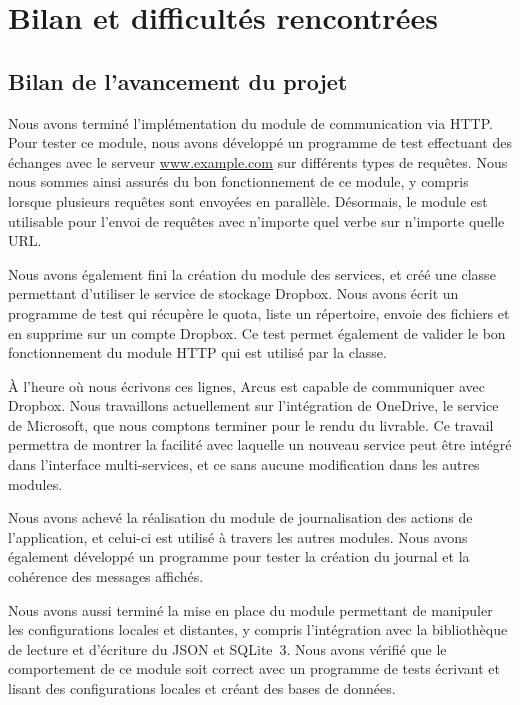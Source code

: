 \chapter{Bilan et difficultés rencontrées}

\section{Bilan de l'avancement du projet}

Nous avons terminé l'implémentation du module de communication via HTTP. Pour tester ce module, nous avons développé un programme de test effectuant des échanges avec le serveur \url{www.example.com} sur différents types de requêtes. Nous nous sommes ainsi assurés du bon fonctionnement de ce module, y compris lorsque plusieurs requêtes sont envoyées en parallèle. Désormais, le module est utilisable pour l'envoi de requêtes avec n'importe quel verbe sur n'importe quelle URL.

Nous avons également fini la création du module des services, et créé une classe permettant d'utiliser le service de stockage Dropbox. Nous avons écrit un programme de test qui récupère le quota, liste un répertoire, envoie des fichiers et en supprime sur un compte Dropbox. Ce test permet également de valider le bon fonctionnement du module HTTP qui est utilisé par la classe.

À l'heure où nous écrivons ces lignes, Arcus est capable de communiquer avec Dropbox. Nous travaillons actuellement sur l'intégration de OneDrive, le service de Microsoft, que nous comptons terminer pour le rendu du livrable. Ce travail permettra de montrer la facilité avec laquelle un nouveau service peut être intégré dans l'interface multi-services, et ce sans aucune modification dans les autres modules.

Nous avons achevé la réalisation du module de journalisation des actions de l'application, et celui-ci est utilisé à travers les autres modules. Nous avons également développé un programme pour tester la création du journal et la cohérence des messages affichés.

Nous avons aussi terminé la mise en place du module permettant de manipuler les configurations locales et distantes, y compris l'intégration avec la bibliothèque de lecture et d'écriture du JSON et SQLite~3. Nous avons vérifié que le comportement de ce module soit correct avec un programme de tests écrivant et lisant des configurations locales et créant des bases de données.

